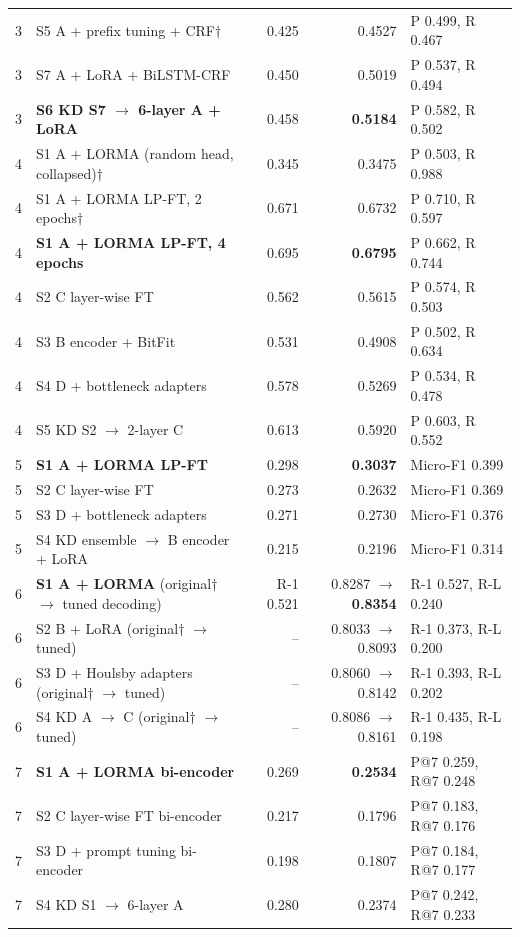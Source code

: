 \documentclass[11pt, oneside]{article}
\newcommand{\A}{\textsf{A}}\newcommand{\B}{\textsf{B}}\newcommand{\C}{\textsf{C}}\newcommand{\D}{\textsf{D}}
\begin{document}
\begin{table}[t]
\begin{tabular}{clrrl}
3 & S5 \A{} + prefix tuning + CRF$\dagger$ & 0.425 & 0.4527 & P 0.499, R 0.467 \\
3 & S7 \A{} + LoRA + BiLSTM-CRF & 0.450 & 0.5019 & P 0.537, R 0.494 \\
3 & \textbf{S6 KD S7 $\rightarrow$ 6-layer \A{} + LoRA} & 0.458 & \textbf{0.5184} & P 0.582, R 0.502 \\\midrule
4 & S1 \A{} + LORMA (random head, collapsed)$\dagger$ & 0.345 & 0.3475 & P 0.503, R 0.988 \\
4 & S1 \A{} + LORMA LP-FT, 2 epochs$\dagger$ & 0.671 & 0.6732 & P 0.710, R 0.597 \\
4 & \textbf{S1 \A{} + LORMA LP-FT, 4 epochs} & 0.695 & \textbf{0.6795} & P 0.662, R 0.744 \\
4 & S2 \C{} layer-wise FT & 0.562 & 0.5615 & P 0.574, R 0.503 \\
4 & S3 \B{} encoder + BitFit & 0.531 & 0.4908 & P 0.502, R 0.634 \\
4 & S4 \D{} + bottleneck adapters & 0.578 & 0.5269 & P 0.534, R 0.478 \\
4 & S5 KD S2 $\rightarrow$ 2-layer \C{} & 0.613 & 0.5920 & P 0.603, R 0.552 \\\midrule
5 & \textbf{S1 \A{} + LORMA LP-FT} & 0.298 & \textbf{0.3037} & Micro-F1 0.399 \\
5 & S2 \C{} layer-wise FT & 0.273 & 0.2632 & Micro-F1 0.369 \\
5 & S3 \D{} + bottleneck adapters & 0.271 & 0.2730 & Micro-F1 0.376 \\
5 & S4 KD ensemble $\rightarrow$ \B{} encoder + LoRA & 0.215 & 0.2196 & Micro-F1 0.314 \\\midrule
6 & \textbf{S1 \A{} + LORMA} (original$\dagger$ $\rightarrow$ tuned decoding) & R-1 0.521 & 0.8287 $\rightarrow$ \textbf{0.8354} & R-1 0.527, R-L 0.240 \\
6 & S2 \B{} + LoRA (original$\dagger$ $\rightarrow$ tuned) & -- & 0.8033 $\rightarrow$ 0.8093 & R-1 0.373, R-L 0.200 \\
6 & S3 \D{} + Houlsby adapters (original$\dagger$ $\rightarrow$ tuned) & -- & 0.8060 $\rightarrow$ 0.8142 & R-1 0.393, R-L 0.202 \\
6 & S4 KD \A{} $\rightarrow$ \C{} (original$\dagger$ $\rightarrow$ tuned) & -- & 0.8086 $\rightarrow$ 0.8161 & R-1 0.435, R-L 0.198 \\
7 & \textbf{S1 \A{} + LORMA bi-encoder} & 0.269 & \textbf{0.2534} & P@7 0.259, R@7 0.248 \\
7 & S2 \C{} layer-wise FT bi-encoder & 0.217 & 0.1796 & P@7 0.183, R@7 0.176 \\
7 & S3 \D{} + prompt tuning bi-encoder & 0.198 & 0.1807 & P@7 0.184, R@7 0.177 \\
7 & S4 KD S1 $\rightarrow$ 6-layer \A{} & 0.280 & 0.2374 & P@7 0.242, R@7 0.233 \\
\bottomrule
\end{tabular}

\end{table}
\end{document}

